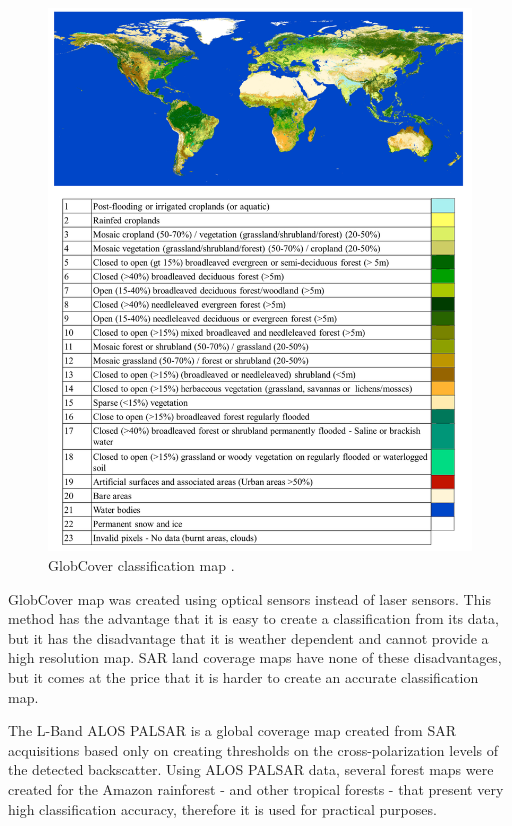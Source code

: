 \begin{figure}[H]
    \centering
    \includegraphics[width=\linewidth]{Cap2/glob_cover.png}
    \caption{GlobCover classification map \cite{Paolathesis}.}
    \label{fig:glob_cover_map}
\end{figure}

GlobCover map was created using optical sensors instead of laser sensors. This method has the advantage that it is easy to create a classification from its data, but it has the disadvantage that it is weather dependent and cannot provide a high resolution map.
SAR land coverage maps have none of these disadvantages, but it comes at the price that it is harder to create an accurate classification map.

The L-Band ALOS PALSAR \cite{alos1, alos2, alos3,alos4, alos5, alos6} is a global coverage map created from SAR acquisitions based only on creating thresholds on the cross-polarization levels of the detected backscatter. Using ALOS PALSAR data, several forest maps were created for the Amazon rainforest - and other tropical forests -  that present very high classification accuracy, therefore it is used for practical purposes.

